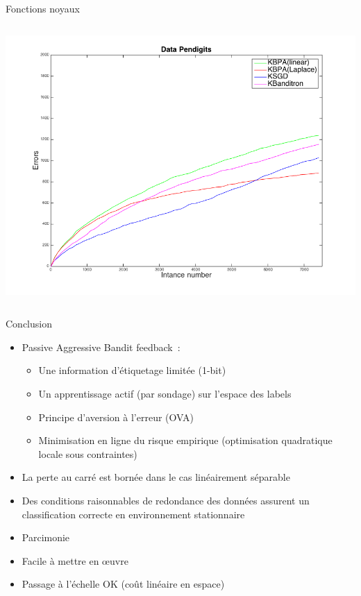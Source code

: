 \documentclass{beamer}
\begin{document}
\begin{frame}{Fonctions noyaux}
\begin{columns}[t]
\begin{column}{.45\linewidth}
	\centerline{
		\includegraphics[width=\linewidth]{figs/Pendigits_kernel_CM.png}}
		\end{column}	
	\end{columns}
\end{frame}

\begin{frame}{Conclusion}
	\begin{itemize}
		\item Passive Aggressive Bandit feedback~:
		\begin{itemize}
			\item Une information d'étiquetage limitée (1-bit)
			\item Un apprentissage actif (par sondage) sur l'espace des labels 
			\item Principe d'aversion à l'erreur (OVA)
			\item Minimisation en ligne du risque empirique (optimisation quadratique locale sous contraintes)
		\end{itemize} 
		\item La perte au carré est bornée dans le cas linéairement séparable
		\item Des conditions raisonnables de redondance des données assurent un classification correcte en environnement stationnaire
		\item Parcimonie
		\item Facile à mettre en œuvre
		\item Passage à l'échelle OK (coût linéaire en espace)
	\end{itemize}
\end{frame}
\end{document}
